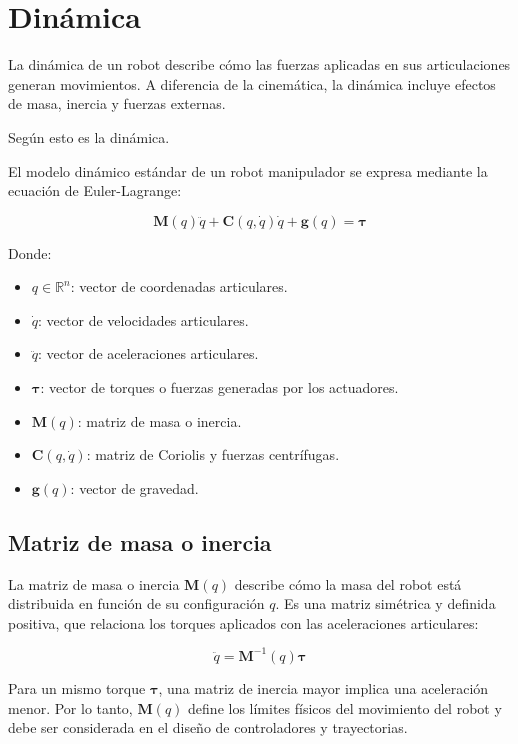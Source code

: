 \section{Dinámica} \label{sec:dinamica}

La dinámica de un robot describe cómo las fuerzas aplicadas en sus articulaciones generan movimientos. A diferencia de la cinemática, la dinámica incluye efectos de masa, inercia y fuerzas externas.

Según \cite{roboticsDynamics} esto es la dinámica.

El modelo dinámico estándar de un robot manipulador se expresa mediante la ecuación de Euler-Lagrange:

\begin{equation}
	\mathbf{M}(q)\ddot{q} + \mathbf{C}(q,\dot{q})\dot{q} + \mathbf{g}(q) = \boldsymbol{\tau}
\end{equation}

Donde:
\begin{itemize}
	\item \( q \in \mathbb{R}^n \): vector de coordenadas articulares.
	\item \( \dot{q} \): vector de velocidades articulares.
	\item \( \ddot{q} \): vector de aceleraciones articulares.
	\item \( \boldsymbol{\tau} \): vector de torques o fuerzas generadas por los actuadores.
	\item \( \mathbf{M}(q) \): matriz de masa o inercia.
	\item \( \mathbf{C}(q, \dot{q}) \): matriz de Coriolis y fuerzas centrífugas.
	\item \( \mathbf{g}(q) \): vector de gravedad.
\end{itemize}
 

\subsection{Matriz de masa o inercia}


La matriz de masa o inercia \( \mathbf{M}(q) \) describe cómo la masa del robot está distribuida en función de su configuración \( q \). Es una matriz simétrica y definida positiva, que relaciona los torques aplicados con las aceleraciones articulares:

\[
\ddot{q} = \mathbf{M}^{-1}(q) \boldsymbol{\tau}
\]

Para un mismo torque \( \boldsymbol{\tau} \), una matriz de inercia mayor implica una aceleración menor. Por lo tanto, \( \mathbf{M}(q) \) define los límites físicos del movimiento del robot y debe ser considerada en el diseño de controladores y trayectorias.


